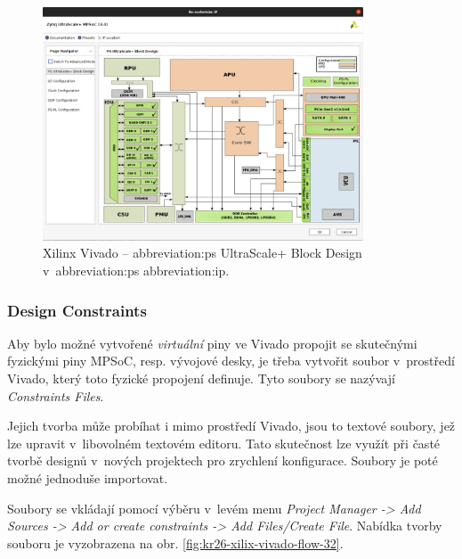 \documentclass[a4paper, twoside, 11pt]{article}
\begin{document}
				\begin{figure}[htbp!]
					\centering
					\includegraphics[width=0.85\textwidth]{src/png/kr26-xilinx-vivado-flow/kr26-xilix-vivado-flow-28.jpg}
					\caption{Xilinx Vivado – \gls{abbreviation:ps} UltraScale+ Block Design v~\gls{abbreviation:ps} \gls{abbreviation:ip}.}
					\label{fig:kr26-xilix-vivado-flow-28}
				\end{figure}

			\subsubsection{Design Constraints}
				Aby bylo možné vytvořené \textit{virtuální} piny ve Vivado propojit se skutečnými fyzickými piny MPSoC, resp. vývojové desky, je třeba vytvořit soubor v~prostředí Vivado, který toto fyzické propojení definuje. Tyto soubory se nazývají \textit{Constraints Files}.\par
				Jejich tvorba může probíhat i mimo prostředí Vivado, jsou to textové soubory, jež lze upravit v~libovolném textovém editoru. Tato skutečnost lze využít při časté tvorbě designů v~nových projektech pro zrychlení konfigurace. Soubory je poté možné jednoduše importovat.\par
				Soubory se vkládají pomocí výběru v~levém menu \textit{Project Manager -> Add Sources -> Add or create constraints -> Add Files/Create File}. Nabídka tvorby souboru je vyzobrazena na obr. \ref{fig:kr26-xilix-vivado-flow-32}.\par
\end{document}
